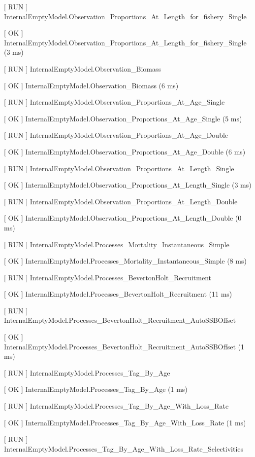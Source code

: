 \documentclass[a4paper,11pt,twoside,pdftex,draft]{article}
\begin{document}
{[} RUN {]}
InternalEmptyModel.Observation\_Proportions\_At\_Length\_for\_fishery\_Single

{[} OK {]}
InternalEmptyModel.Observation\_Proportions\_At\_Length\_for\_fishery\_Single
(3 ms)

{[} RUN {]} InternalEmptyModel.Observation\_Biomass

{[} OK {]} InternalEmptyModel.Observation\_Biomass (6 ms)

{[} RUN {]} InternalEmptyModel.Observation\_Proportions\_At\_Age\_Single

{[} OK {]} InternalEmptyModel.Observation\_Proportions\_At\_Age\_Single
(5 ms)

{[} RUN {]} InternalEmptyModel.Observation\_Proportions\_At\_Age\_Double

{[} OK {]} InternalEmptyModel.Observation\_Proportions\_At\_Age\_Double
(6 ms)

{[} RUN {]}
InternalEmptyModel.Observation\_Proportions\_At\_Length\_Single

{[} OK {]}
InternalEmptyModel.Observation\_Proportions\_At\_Length\_Single (3 ms)

{[} RUN {]}
InternalEmptyModel.Observation\_Proportions\_At\_Length\_Double

{[} OK {]}
InternalEmptyModel.Observation\_Proportions\_At\_Length\_Double (0 ms)

{[} RUN {]}
InternalEmptyModel.Processes\_Mortality\_Instantaneous\_Simple

{[} OK {]}
InternalEmptyModel.Processes\_Mortality\_Instantaneous\_Simple (8 ms)

{[} RUN {]} InternalEmptyModel.Processes\_BevertonHolt\_Recruitment

{[} OK {]} InternalEmptyModel.Processes\_BevertonHolt\_Recruitment (11
ms)

{[} RUN {]}
InternalEmptyModel.Processes\_BevertonHolt\_Recruitment\_AutoSSBOffset

{[} OK {]}
InternalEmptyModel.Processes\_BevertonHolt\_Recruitment\_AutoSSBOffset
(1 ms)

{[} RUN {]} InternalEmptyModel.Processes\_Tag\_By\_Age

{[} OK {]} InternalEmptyModel.Processes\_Tag\_By\_Age (1 ms)

{[} RUN {]} InternalEmptyModel.Processes\_Tag\_By\_Age\_With\_Loss\_Rate

{[} OK {]} InternalEmptyModel.Processes\_Tag\_By\_Age\_With\_Loss\_Rate
(1 ms)

{[} RUN {]}
InternalEmptyModel.Processes\_Tag\_By\_Age\_With\_Loss\_Rate\_Selectivities
\end{document}
